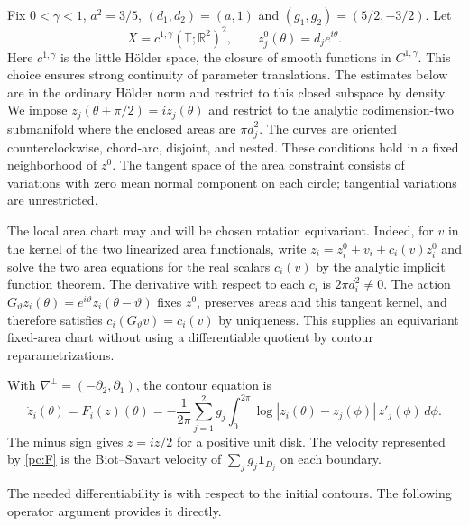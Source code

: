 \documentclass[11pt]{amsart}
\theoremstyle{remark}
\numberwithin{equation}{section}
\newcommand{\R}{\mathbb R}
\newcommand{\T}{\mathbb T}
\begin{document}
Fix $0<\gamma<1$, $a^2=3/5$, $(d_1,d_2)=(a,1)$ and $(g_1,g_2)=(5/2,-3/2)$. Let
\[
 X=c^{1,\gamma}(\T;\R^2)^2,\qquad z^0_j(\theta)=d_je^{i\theta}.
\]
Here $c^{1,\gamma}$ is the little H\"older space, the closure of smooth functions in $C^{1,\gamma}$. This choice ensures strong continuity of parameter translations. The estimates below are in the ordinary H\"older norm and restrict to this closed subspace by density.
We impose $z_j(\theta+\pi/2)=iz_j(\theta)$ and restrict to the analytic codimension-two submanifold where the enclosed areas are $\pi d_j^2$. The curves are oriented counterclockwise, chord-arc, disjoint, and nested. These conditions hold in a fixed neighborhood of $z^0$. The tangent space of the area constraint consists of variations with zero mean normal component on each circle; tangential variations are unrestricted.

The local area chart may and will be chosen rotation equivariant. Indeed, for $v$ in the kernel of the two linearized area functionals, write $z_i=z_i^0+v_i+c_i(v)z_i^0$ and solve the two area equations for the real scalars $c_i(v)$ by the analytic implicit function theorem. The derivative with respect to each $c_i$ is $2\pi d_i^2\ne0$. The action $G_\vartheta z_i(\theta)=e^{i\vartheta}z_i(\theta-\vartheta)$ fixes $z^0$, preserves areas and this tangent kernel, and therefore satisfies $c_i(G_\vartheta v)=c_i(v)$ by uniqueness. This supplies an equivariant fixed-area chart without using a differentiable quotient by contour reparametrizations.

With $\nabla^\perp=(-\partial_2,\partial_1)$, the contour equation is
\begin{equation}\label{pc:F}
 \dot z_i(\theta)=F_i(z)(\theta)
 =-\frac1{2\pi}\sum_{j=1}^2g_j
 \int_0^{2\pi}\log|z_i(\theta)-z_j(\phi)|\,z'_j(\phi)\,d\phi.
\end{equation}
The minus sign gives $\dot z=iz/2$ for a positive unit disk. The velocity represented by \eqref{pc:F} is the Biot--Savart velocity of $\sum_jg_j\mathbf1_{D_j}$ on each boundary.



The needed differentiability is with respect to the initial contours.
The following operator argument provides it directly.
\end{document}

